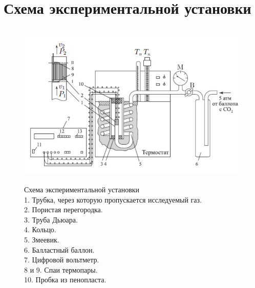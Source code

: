 \documentclass[a4paper]{article}
\begin{document}
	\section{Схема экспериментальной установки}
	\begin{figure}[ht!]
		\centering
		\includegraphics[height=80mm]{scheme.png}
		\caption{Схема экспериментальной установки \\ 1. Трубка, через которую пропускается исследуемый газ. \\ 2. Пористая перегородка. \\ 3. Труба Дьюара. \\ 4. Кольцо. \\ 5. Змеевик. \\ 6. Балластный баллон. \\ 7. Цифровой вольтметр. \\ 8 и 9. Спаи термопары. \\10. Пробка из пенопласта. \label{overflow}}
	\end{figure}
\end{document}
